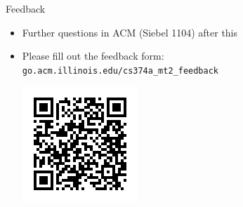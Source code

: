 \documentclass{beamer}
\begin{document}
\begin{frame}{Feedback}
    \begin{itemize}
        \item Further questions in ACM (Siebel 1104) after this
        \item Please fill out the feedback form: \texttt{go.acm.illinois.edu/cs374a\_mt2\_feedback}\begin{center}
            \includegraphics[height=.6\textwidth]{feedback.png}
        \end{center}
    \end{itemize}
\end{frame}
\end{document}
